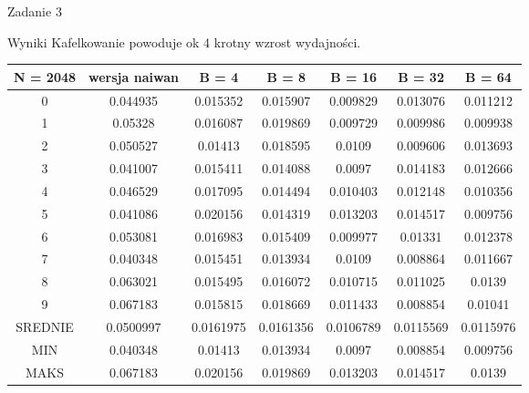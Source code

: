 \documentclass[11pt,wide]{mwart}
\begin{document}
\begin{section}{Zadanie 3}
\begin{subsection}{Wyniki}
Kafelkowanie powoduje ok 4 krotny wzrost wydajności.

\begin{center}
\begin{tabular}{|c|c|c|c|c|c|c|}
\hline
N = 2048 & wersja naiwan & B = 4 & B = 8 & B = 16 & B = 32 & B = 64\\
\hline
0 & 0.044935 & 0.015352 & 0.015907 & 0.009829 & 0.013076 & 0.011212\\
\hline
1 & 0.05328 & 0.016087 & 0.019869 & 0.009729 & 0.009986 & 0.009938\\
\hline
2 & 0.050527 & 0.01413 & 0.018595 & 0.0109 & 0.009606 & 0.013693\\
\hline
3 & 0.041007 & 0.015411 & 0.014088 & 0.0097 & 0.014183 & 0.012666\\
\hline
4 & 0.046529 & 0.017095 & 0.014494 & 0.010403 & 0.012148 & 0.010356\\
\hline
5 & 0.041086 & 0.020156 & 0.014319 & 0.013203 & 0.014517 & 0.009756\\
\hline
6 & 0.053081 & 0.016983 & 0.015409 & 0.009977 & 0.01331 & 0.012378\\
\hline
7 & 0.040348 & 0.015451 & 0.013934 & 0.0109 & 0.008864 & 0.011667\\
\hline
8 & 0.063021 & 0.015495 & 0.016072 & 0.010715 & 0.011025 & 0.0139\\
\hline
9 & 0.067183 & 0.015815 & 0.018669 & 0.011433 & 0.008854 & 0.01041\\
\hline
SREDNIE & 0.0500997 & 0.0161975 & 0.0161356 & 0.0106789 & 0.0115569 & 0.0115976\\
\hline
MIN & 0.040348 & 0.01413 & 0.013934 & 0.0097 & 0.008854 & 0.009756\\
\hline
MAKS & 0.067183 & 0.020156 & 0.019869 & 0.013203 & 0.014517 & 0.0139\\
\hline
\end{tabular}
\end{center}


\end{subsection}
\end{section}
\end{document}
